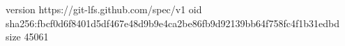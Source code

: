 version https://git-lfs.github.com/spec/v1
oid sha256:fbcf0d6f8401d5df467e48d9b9e4ca2be86fb9d92139bb64f758fc4f1b31edbd
size 45061

